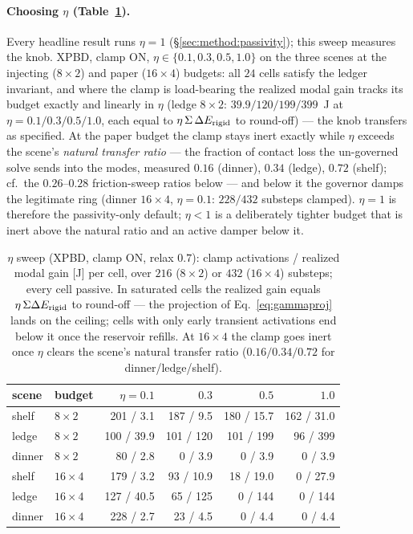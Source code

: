 \paragraph*{Choosing $\eta$ (Table~\ref{tab:eta}).} Every headline result runs
$\eta=1$ (\S\ref{sec:method:passivity}); this sweep measures the knob. XPBD,
clamp ON, $\eta\in\{0.1,0.3,0.5,1.0\}$ on the three scenes at the injecting
($8{\times}2$) and paper ($16{\times}4$) budgets: all $24$ cells satisfy the
ledger invariant, and where the clamp is load-bearing the realized modal gain
tracks its budget exactly and linearly in $\eta$ (ledge $8{\times}2$:
$39.9/120/199/399$~J at $\eta=0.1/0.3/0.5/1.0$, each equal to
$\eta\,\Sigma\,\Delta E_{\mathrm{rigid}}$ to round-off) --- the knob transfers as specified. At
the paper budget the clamp stays inert exactly while $\eta$ exceeds the
scene's \emph{natural transfer ratio} --- the fraction of contact loss the
un-governed solve sends into the modes, measured $0.16$ (dinner), $0.34$
(ledge), $0.72$ (shelf); cf.\ the $0.26$--$0.28$ friction-sweep ratios below
--- and below it the governor damps the legitimate ring (dinner
$16{\times}4$, $\eta=0.1$: $228/432$ substeps clamped). $\eta=1$ is therefore
the passivity-only default; $\eta<1$ is a deliberately tighter budget that is
inert above the natural ratio and an active damper below it.

\begin{table}[t]\centering\footnotesize
\setlength{\tabcolsep}{4.5pt}
\caption{$\eta$ sweep (XPBD, clamp ON, relax $0.7$): clamp activations /
realized modal gain [J] per cell, over $216$ ($8{\times}2$) or $432$
($16{\times}4$) substeps; every cell passive. In saturated cells the realized
gain equals $\eta\,\Sigma\Delta E_{\mathrm{rigid}}$ to round-off --- the projection of
Eq.~\ref{eq:gammaproj} lands on the ceiling; cells with only early transient
activations end below it once the reservoir refills. At $16{\times}4$ the
clamp goes inert once $\eta$ clears the scene's natural transfer ratio
($0.16/0.34/0.72$ for dinner/ledge/shelf).}
\label{tab:eta}
\begin{tabular}{llrrrr}
\toprule
scene & budget & $\eta{=}0.1$ & $0.3$ & $0.5$ & $1.0$ \\
\midrule
shelf  & $8{\times}2$  & 201 / 3.1  & 187 / 9.5 & 180 / 15.7 & 162 / 31.0 \\
ledge  & $8{\times}2$  & 100 / 39.9 & 101 / 120 & 101 / 199  & 96 / 399 \\
dinner & $8{\times}2$  & 80 / 2.8   & 0 / 3.9   & 0 / 3.9    & 0 / 3.9 \\
shelf  & $16{\times}4$ & 179 / 3.2  & 93 / 10.9 & 18 / 19.0  & 0 / 27.9 \\
ledge  & $16{\times}4$ & 127 / 40.5 & 65 / 125  & 0 / 144    & 0 / 144 \\
dinner & $16{\times}4$ & 228 / 2.7  & 23 / 4.5  & 0 / 4.4    & 0 / 4.4 \\
\bottomrule
\end{tabular}
\end{table}

